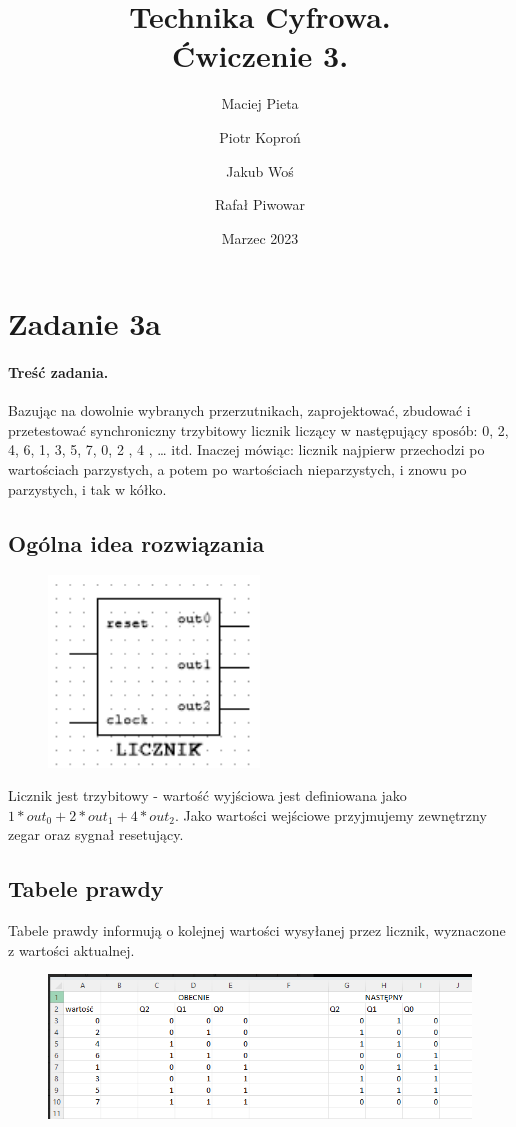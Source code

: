 \documentclass{article}
\author{Maciej Pieta \and Piotr Koproń \and Jakub Woś \and Rafał Piwowar}
\date{Marzec 2023}
\title{Technika Cyfrowa. \\ Ćwiczenie 3.}
\begin{document}
\maketitle
\newpage
\section{Zadanie 3a}
\paragraph{Treść zadania.}
Bazując na dowolnie wybranych przerzutnikach, zaprojektować, zbudować i przetestować synchroniczny trzybitowy licznik liczący w następujący sposób:
     0, 2, 4, 6, 1, 3, 5, 7, 0, 2 , 4 , … itd.
Inaczej mówiąc: licznik najpierw przechodzi po wartościach parzystych, a potem po wartościach nieparzystych, i znowu po parzystych, i tak w kółko.
\subsection{Ogólna idea rozwiązania}
\begin{figure}[H]
\includegraphics[width = 0.5\textwidth]{3a_blackbox}
\end{figure}
Licznik jest trzybitowy - wartość wyjściowa jest definiowana jako $1*out_{0}+2*out_{1}+4*out_{2}$.
Jako wartości wejściowe przyjmujemy zewnętrzny zegar oraz sygnał resetujący.
\subsection{Tabele prawdy}
Tabele prawdy informują o kolejnej wartości wysyłanej przez licznik, wyznaczone z wartości aktualnej.
\begin{figure}[H]
\includegraphics[width = \textwidth]{3a_tabele_prawdy}
\end{figure}
\end{document}
